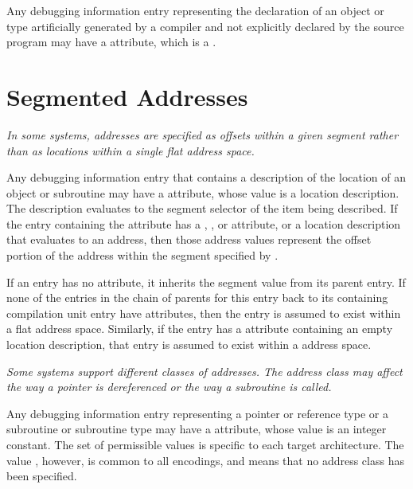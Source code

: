 Any debugging information entry representing the
declaration of an object or type artificially generated by
a compiler and not explicitly declared by the source program
\hypertarget{chap:DWATartificialobjectsortypesthat}{}
may have a 
\DWATartificial{} attribute, 
which is a .

\section{Segmented Addresses}
\label{chap:segmentedaddresses}
\textit{In some systems, addresses are specified as offsets within a
given 
segment 
rather than as locations within a single flat
address space.}

Any debugging information entry that contains a description
\hypertarget{chap:DWATsegmentaddressinginformation}{}
of the location of an object or subroutine may have a 
\DWATsegment{} attribute, 
whose value is a location
description. The description evaluates to the segment selector
of the item being described. If the entry containing the
\DWATsegment{} attribute has a 
\DWATlowpc, 
\DWAThighpc,
\DWATranges{} or 
\DWATentrypc{} attribute, 
or 
a location
description that evaluates to an address, then those address
values represent the offset portion of the address within
the segment specified 
by \DWATsegment.

If an entry has no 
\DWATsegment{} attribute, it inherits
the segment value from its parent entry.  If none of the
entries in the chain of parents for this entry back to
its containing compilation unit entry have 
\DWATsegment{} attributes, 
then the entry is assumed to exist within a flat
address space. 
Similarly, if the entry has a 
\DWATsegment{} attribute 
containing an empty location description, that
entry is assumed to exist within a 
address space.

\textit{Some systems support different 
classes of addresses. 
The address class may affect the way a pointer is dereferenced
or the way a subroutine is called.}


Any debugging information entry representing a pointer or
reference type or a subroutine or subroutine type may 
have a 
\DWATaddressclass{}
attribute, whose value is an integer
constant.  The set of permissible values is specific to
each target architecture. The value \DWADDRnoneTARG, 
however,
is common to all encodings, and means that no address class
has been specified.

